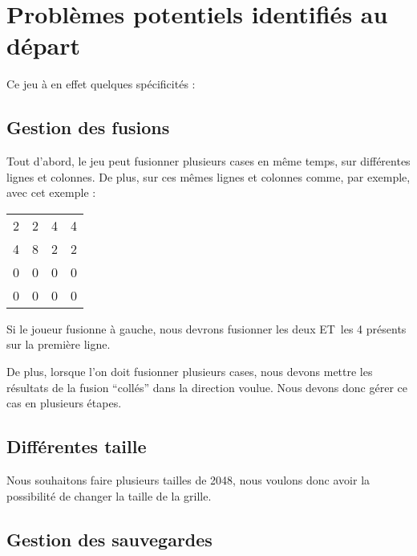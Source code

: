 \documentclass[letter]{article}
\date{\today}
\title{}
\begin{document}





\setcounter{tocdepth}{2}
\tableofcontents

\newpage


\section{Problèmes potentiels identifiés au départ}
\label{sec:org32da960}

Ce jeu à en effet quelques spécificités :

\subsection{Gestion des fusions}
\label{sec:org7c91f4f}

Tout d'abord, le jeu peut fusionner plusieurs cases en même temps, sur différentes lignes et colonnes. De plus, sur ces mêmes lignes et colonnes comme, par exemple, avec cet exemple :

\begin{center}
\begin{tabular}{rrrr}
2 & 2 & 4 & 4\\
4 & 8 & 2 & 2\\
0 & 0 & 0 & 0\\
0 & 0 & 0 & 0\\
\end{tabular}
\end{center}

Si le joueur fusionne à gauche, nous devrons fusionner les deux ET les 4 présents sur la première ligne.

De plus, lorsque l'on doit fusionner plusieurs cases, nous devons mettre les résultats de la fusion “collés” dans la direction voulue.
Nous devons donc gérer ce cas en plusieurs étapes.

\subsection{Différentes taille}
\label{sec:orgb30459e}

Nous souhaitons faire plusieurs tailles de 2048, nous voulons donc avoir la possibilité de changer la taille de la grille.

\subsection{Gestion des sauvegardes}
\label{sec:org76ecd61}
\end{document}
